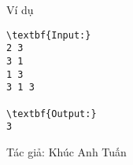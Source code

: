 Ví dụ
\begin{verbatim}
\textbf{Input:}
2 3
3 1
1 3
3 1 3

\textbf{Output:}
3
\end{verbatim}

Tác giả: Khúc Anh Tuấn